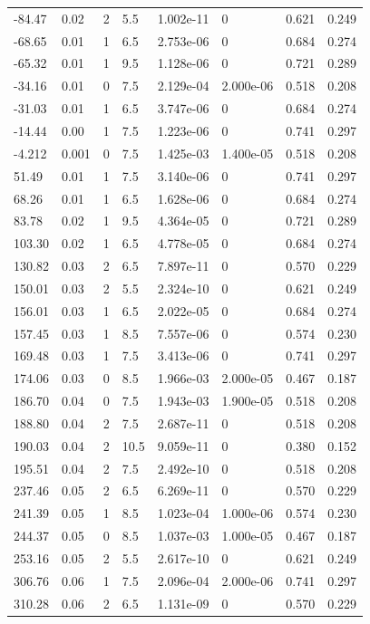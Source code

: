\documentclass[preview]{standalone}
\begin{document}
{{\begin{tabular}{L{1.2cm}C{1.2cm} C{0.3cm}C{0.5cm} C{1.4cm}C{1.4cm} C{1.4cm}C{1.4cm}}
  -84.47  &  0.02  & 2     & 5.5 &  1.002e-11  & 0  & 0.621 &  0.249   \\ 
  -68.65  &  0.01  & 1     & 6.5 &  2.753e-06  & 0  & 0.684 &  0.274   \\ 
  -65.32  &  0.01  & 1     & 9.5 &  1.128e-06  & 0  & 0.721 &  0.289   \\ 
  -34.16  &  0.01  & 0     & 7.5 &  2.129e-04  & 2.000e-06  & 0.518 &  0.208   \\ 
  -31.03  &  0.01  & 1     & 6.5 &  3.747e-06  & 0  & 0.684 &  0.274   \\ 
  -14.44  &  0.00  & 1     & 7.5 &  1.223e-06  & 0  & 0.741 &  0.297   \\ 
  -4.212  &  0.001  & 0     & 7.5 &  1.425e-03  & 1.400e-05  & 0.518 &  0.208   \\ 
  51.49  &  0.01  & 1     & 7.5 &  3.140e-06  & 0  & 0.741 &  0.297   \\ 
  68.26  &  0.01  & 1     & 6.5 &  1.628e-06  & 0  & 0.684 &  0.274   \\ 
  83.78  &  0.02  & 1     & 9.5 &  4.364e-05  & 0  & 0.721 &  0.289   \\ 
  103.30  &  0.02  & 1     & 6.5 &  4.778e-05  & 0  & 0.684 &  0.274   \\ 
  130.82  &  0.03  & 2     & 6.5 &  7.897e-11  & 0  & 0.570 &  0.229   \\ 
  150.01  &  0.03  & 2     & 5.5 &  2.324e-10  & 0  & 0.621 &  0.249   \\ 
  156.01  &  0.03  & 1     & 6.5 &  2.022e-05  & 0  & 0.684 &  0.274   \\ 
  157.45  &  0.03  & 1     & 8.5 &  7.557e-06  & 0  & 0.574 &  0.230   \\ 
  169.48  &  0.03  & 1     & 7.5 &  3.413e-06  & 0  & 0.741 &  0.297   \\ 
  174.06  &  0.03  & 0     & 8.5 &  1.966e-03  & 2.000e-05  & 0.467 &  0.187   \\ 
  186.70  &  0.04  & 0     & 7.5 &  1.943e-03  & 1.900e-05  & 0.518 &  0.208   \\ 
  188.80  &  0.04  & 2     & 7.5 &  2.687e-11  & 0  & 0.518 &  0.208   \\ 
  190.03  &  0.04  & 2     & 10.5 &  9.059e-11  & 0  & 0.380 &  0.152   \\ 
  195.51  &  0.04  & 2     & 7.5 &  2.492e-10  & 0  & 0.518 &  0.208   \\ 
  237.46  &  0.05  & 2     & 6.5 &  6.269e-11  & 0  & 0.570 &  0.229   \\ 
  241.39  &  0.05  & 1     & 8.5 &  1.023e-04  & 1.000e-06  & 0.574 &  0.230   \\ 
  244.37  &  0.05  & 0     & 8.5 &  1.037e-03  & 1.000e-05  & 0.467 &  0.187   \\ 
  253.16  &  0.05  & 2     & 5.5 &  2.617e-10  & 0  & 0.621 &  0.249   \\ 
  306.76  &  0.06  & 1     & 7.5 &  2.096e-04  & 2.000e-06  & 0.741 &  0.297   \\ 
  310.28  &  0.06  & 2     & 6.5 &  1.131e-09  & 0  & 0.570 &  0.229   \\ 
\hline 
\end{tabular} 

}}
\end{document}

